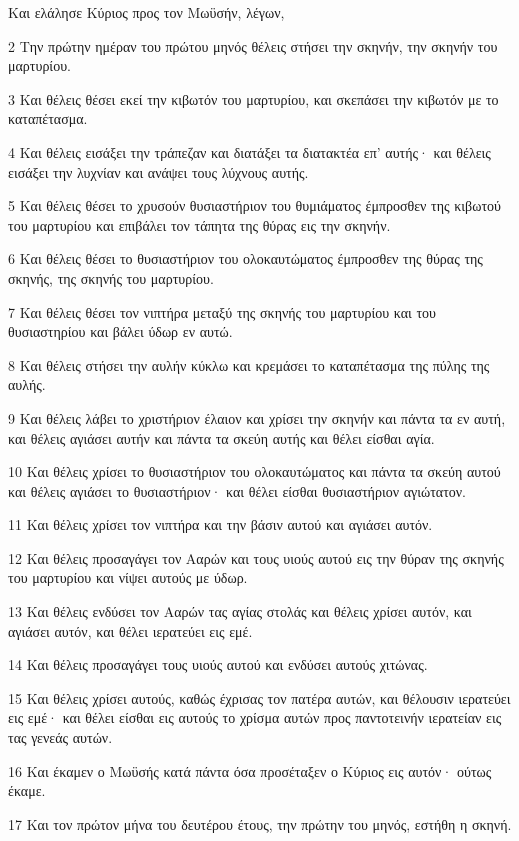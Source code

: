 \par Και ελάλησε Κύριος προς τον Μωϋσήν, λέγων,
\par 2 Την πρώτην ημέραν του πρώτου μηνός θέλεις στήσει την σκηνήν, την σκηνήν του μαρτυρίου.
\par 3 Και θέλεις θέσει εκεί την κιβωτόν του μαρτυρίου, και σκεπάσει την κιβωτόν με το καταπέτασμα.
\par 4 Και θέλεις εισάξει την τράπεζαν και διατάξει τα διατακτέα επ' αυτής· και θέλεις εισάξει την λυχνίαν και ανάψει τους λύχνους αυτής.
\par 5 Και θέλεις θέσει το χρυσούν θυσιαστήριον του θυμιάματος έμπροσθεν της κιβωτού του μαρτυρίου και επιβάλει τον τάπητα της θύρας εις την σκηνήν.
\par 6 Και θέλεις θέσει το θυσιαστήριον του ολοκαυτώματος έμπροσθεν της θύρας της σκηνής, της σκηνής του μαρτυρίου.
\par 7 Και θέλεις θέσει τον νιπτήρα μεταξύ της σκηνής του μαρτυρίου και του θυσιαστηρίου και βάλει ύδωρ εν αυτώ.
\par 8 Και θέλεις στήσει την αυλήν κύκλω και κρεμάσει το καταπέτασμα της πύλης της αυλής.
\par 9 Και θέλεις λάβει το χριστήριον έλαιον και χρίσει την σκηνήν και πάντα τα εν αυτή, και θέλεις αγιάσει αυτήν και πάντα τα σκεύη αυτής και θέλει είσθαι αγία.
\par 10 Και θέλεις χρίσει το θυσιαστήριον του ολοκαυτώματος και πάντα τα σκεύη αυτού και θέλεις αγιάσει το θυσιαστήριον· και θέλει είσθαι θυσιαστήριον αγιώτατον.
\par 11 Και θέλεις χρίσει τον νιπτήρα και την βάσιν αυτού και αγιάσει αυτόν.
\par 12 Και θέλεις προσαγάγει τον Ααρών και τους υιούς αυτού εις την θύραν της σκηνής του μαρτυρίου και νίψει αυτούς με ύδωρ.
\par 13 Και θέλεις ενδύσει τον Ααρών τας αγίας στολάς και θέλεις χρίσει αυτόν, και αγιάσει αυτόν, και θέλει ιερατεύει εις εμέ.
\par 14 Και θέλεις προσαγάγει τους υιούς αυτού και ενδύσει αυτούς χιτώνας.
\par 15 Και θέλεις χρίσει αυτούς, καθώς έχρισας τον πατέρα αυτών, και θέλουσιν ιερατεύει εις εμέ· και θέλει είσθαι εις αυτούς το χρίσμα αυτών προς παντοτεινήν ιερατείαν εις τας γενεάς αυτών.
\par 16 Και έκαμεν ο Μωϋσής κατά πάντα όσα προσέταξεν ο Κύριος εις αυτόν· ούτως έκαμε.
\par 17 Και τον πρώτον μήνα του δευτέρου έτους, την πρώτην του μηνός, εστήθη η σκηνή.
